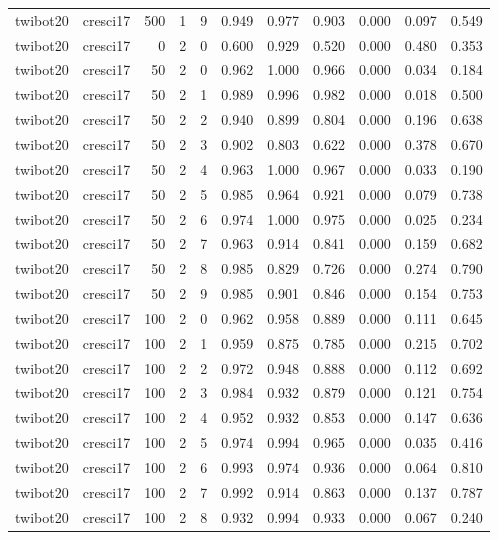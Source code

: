 \begin{tabular}{llrrrrrrrrr}
twibot20 & cresci17 & 500 & 1 & 9 & 0.949 & 0.977 & 0.903 & 0.000 & 0.097 & 0.549 \\
twibot20 & cresci17 & 0 & 2 & 0 & 0.600 & 0.929 & 0.520 & 0.000 & 0.480 & 0.353 \\
twibot20 & cresci17 & 50 & 2 & 0 & 0.962 & 1.000 & 0.966 & 0.000 & 0.034 & 0.184 \\
twibot20 & cresci17 & 50 & 2 & 1 & 0.989 & 0.996 & 0.982 & 0.000 & 0.018 & 0.500 \\
twibot20 & cresci17 & 50 & 2 & 2 & 0.940 & 0.899 & 0.804 & 0.000 & 0.196 & 0.638 \\
twibot20 & cresci17 & 50 & 2 & 3 & 0.902 & 0.803 & 0.622 & 0.000 & 0.378 & 0.670 \\
twibot20 & cresci17 & 50 & 2 & 4 & 0.963 & 1.000 & 0.967 & 0.000 & 0.033 & 0.190 \\
twibot20 & cresci17 & 50 & 2 & 5 & 0.985 & 0.964 & 0.921 & 0.000 & 0.079 & 0.738 \\
twibot20 & cresci17 & 50 & 2 & 6 & 0.974 & 1.000 & 0.975 & 0.000 & 0.025 & 0.234 \\
twibot20 & cresci17 & 50 & 2 & 7 & 0.963 & 0.914 & 0.841 & 0.000 & 0.159 & 0.682 \\
twibot20 & cresci17 & 50 & 2 & 8 & 0.985 & 0.829 & 0.726 & 0.000 & 0.274 & 0.790 \\
twibot20 & cresci17 & 50 & 2 & 9 & 0.985 & 0.901 & 0.846 & 0.000 & 0.154 & 0.753 \\
twibot20 & cresci17 & 100 & 2 & 0 & 0.962 & 0.958 & 0.889 & 0.000 & 0.111 & 0.645 \\
twibot20 & cresci17 & 100 & 2 & 1 & 0.959 & 0.875 & 0.785 & 0.000 & 0.215 & 0.702 \\
twibot20 & cresci17 & 100 & 2 & 2 & 0.972 & 0.948 & 0.888 & 0.000 & 0.112 & 0.692 \\
twibot20 & cresci17 & 100 & 2 & 3 & 0.984 & 0.932 & 0.879 & 0.000 & 0.121 & 0.754 \\
twibot20 & cresci17 & 100 & 2 & 4 & 0.952 & 0.932 & 0.853 & 0.000 & 0.147 & 0.636 \\
twibot20 & cresci17 & 100 & 2 & 5 & 0.974 & 0.994 & 0.965 & 0.000 & 0.035 & 0.416 \\
twibot20 & cresci17 & 100 & 2 & 6 & 0.993 & 0.974 & 0.936 & 0.000 & 0.064 & 0.810 \\
twibot20 & cresci17 & 100 & 2 & 7 & 0.992 & 0.914 & 0.863 & 0.000 & 0.137 & 0.787 \\
twibot20 & cresci17 & 100 & 2 & 8 & 0.932 & 0.994 & 0.933 & 0.000 & 0.067 & 0.240 \\

\end{tabular}

